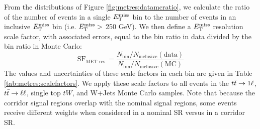From the distributions of Figure \ref{fig:metres:datamcratio}, we
calculate the ratio of the number of events in a single $E_\text{T}^\text{miss}$ bin to
the number of events in an inclusive $E_\text{T}^\text{miss}$ bin (i.e. $E_\text{T}^\text{miss} >$ 250
GeV). We then define a $E_\text{T}^\text{miss}$ resolution scale factor, with associated
errors, equal to the bin ratio in data divided by the bin ratio in
Monte Carlo:
\begin{equation}
\text{SF}_\text{MET res.} = \frac{N_\text{bin} / N_\text{inclusive} (\text{data})}
{N_\text{bin} / N_\text{inclusive} (\text{MC})}
\end{equation}
The values and uncertainties of these scale factors in each bin are
given in Table \ref{tab:metres:scalefactors}. We apply these scale
factors to all events in the $t\bar{t} \rightarrow 1\ell$, $t\bar{t} \rightarrow \ell\ell$, single top $tW$,
and W+Jets Monte Carlo samples. Note that because the corridor signal
regions overlap with the nominal signal regions, some events
receive different weights when considered in a nominal
SR versus in a corridor SR.

